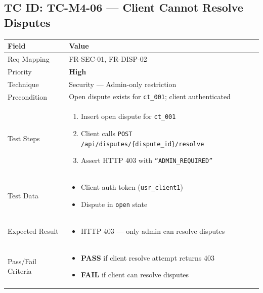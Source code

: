 \documentclass[12pt,a4paper]{article}
\newcommand{\sevhigh}{\textcolor{severityhigh}{\textbf{High}}}
\newcommand{\passresult}{\textcolor{passgreen}{\textbf{PASS}}}
\newcommand{\failresult}{\textcolor{failred}{\textbf{FAIL}}}
\begin{document}
\vspace{0.8cm}

\subsection{TC ID: TC-M4-06 --- Client Cannot Resolve Disputes}

\begin{tabular}{|p{}|p{}|}
\hline
\rowcolor{lightblue} \textbf{Field} & \textbf{Value} \\
\hline
Req Mapping & FR-SEC-01, FR-DISP-02 \\
\hline
Priority & \sevhigh \\
\hline
Technique & Security --- Admin-only restriction \\
\hline
Precondition & Open dispute exists for \texttt{ct\_001}; client authenticated \\
\hline
Test Steps &
\begin{enumerate}[nosep, leftmargin=*]
  \item Insert open dispute for \texttt{ct\_001}
  \item Client calls \texttt{POST /api/disputes/\{dispute\_id\}/resolve}
  \item Assert HTTP 403 with \texttt{``ADMIN\_REQUIRED''}
\end{enumerate} \\
\hline
Test Data &
\begin{itemize}[nosep, leftmargin=*]
  \item Client auth token (\texttt{usr\_client1})
  \item Dispute in \texttt{open} state
\end{itemize} \\
\hline
Expected Result &
\begin{itemize}[nosep, leftmargin=*]
  \item HTTP 403 --- only admin can resolve disputes
\end{itemize} \\
\hline
Pass/Fail Criteria &
\begin{itemize}[nosep, leftmargin=*]
  \item \passresult{} if client resolve attempt returns 403
  \item \failresult{} if client can resolve disputes
\end{itemize} \\
\hline
\end{tabular}
\end{document}
